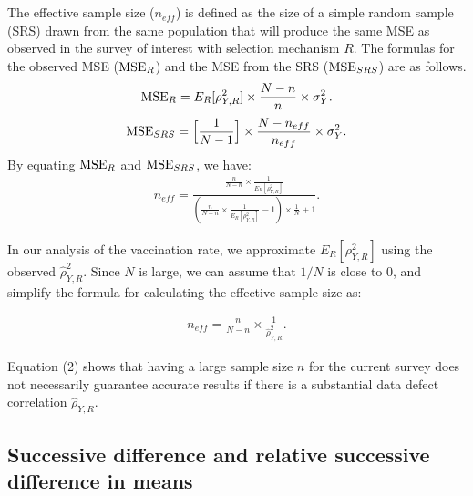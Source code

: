 \documentclass{article}
\begin{document}
\\
\\
The effective sample size ($n_{eff}$) is defined as the size of a simple random sample (SRS) drawn from the same population that will produce the same MSE as observed in the survey of interest with selection mechanism $R$. The formulas for the observed MSE (${\rm MSE}_R$) and the MSE from the SRS (${\rm MSE}_{SRS}$) are as follows.
\begin{align*}
    {\rm MSE}_R = E_R[{\rho}_{Y, R}^2] \times \frac{N - n}{n} \times \sigma^2_{Y}.
\end{align*}
\begin{align*}
    {\rm MSE}_{SRS} = \Big[\frac{1}{N - 1}\Big] \times \frac{N - n_{eff}}{n_{eff}} \times \sigma^2_{Y}.
\end{align*}
\noindent By equating ${\rm MSE}_R$ and ${\rm MSE}_{SRS}$, we have:
\begin{align*}
    n_{eff} = \frac{\frac{n}{N-n} \times \frac{1}{E_R[{\rho}_{Y, R}^2]}}
    {(\frac{n}{N-n} \times \frac{1}{E_R[{\rho}_{Y, R}^2]} - 1) \times \frac{1}{N} + 1}.
\end{align*}

\noindent In our analysis of the vaccination rate, we approximate $E_R[{\rho}_{Y, R}^2]$ using the observed $\hat{\rho}_{Y, R}^2$. Since $N$ is large, we can assume that $1/N$ is close to 0, and simplify the formula for calculating the effective sample size as:

\begin{align}
    n_{eff} = \frac{n}{N - n} \times \frac{1}{\hat{\rho}_{Y, R}^2}.
\end{align}

\noindent Equation (2) shows that having a large sample size $n$ for the current survey does not necessarily guarantee accurate results if there is a substantial data defect correlation $\hat{\rho}_{Y, R}$. 

\subsection{Successive difference and relative successive difference in means}
\end{document}
